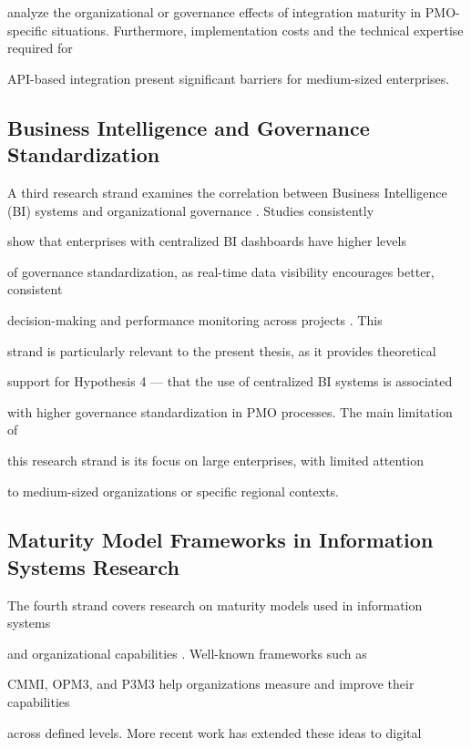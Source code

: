analyze the organizational or governance effects of integration maturity in PMO-specific situations.  Furthermore, implementation costs and the technical expertise required for  

API-based integration present significant barriers for medium-sized enterprises. 

 

\subsection{Business Intelligence and Governance Standardization} 

A third research strand examines the correlation between Business Intelligence (BI) systems and organizational governance \cite{negash2004}. Studies consistently   

show that enterprises with centralized BI dashboards have higher levels   

of governance standardization, as real-time data visibility encourages better, consistent  

decision-making and performance monitoring across projects \cite{pmi2021}. This  

strand is particularly relevant to the present thesis, as it provides theoretical  

support for Hypothesis 4 --- that the use of centralized BI systems is associated  

with higher governance standardization in PMO processes. The main limitation of  

this research strand is its focus on large enterprises, with limited attention  

to medium-sized organizations or specific regional contexts. 

 

\subsection{Maturity Model Frameworks in Information Systems Research} 

The fourth strand covers research on maturity models used in information systems  

and organizational capabilities \cite{paulk1993}. Well-known frameworks such as  

CMMI, OPM3, and P3M3 help organizations measure and improve their capabilities  

across defined levels. More recent work has extended these ideas to digital  

